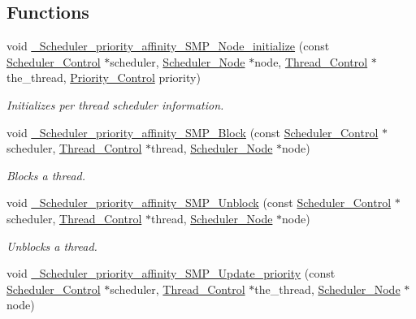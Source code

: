 \subsection*{Functions}
\begin{DoxyCompactItemize}
\item 
void \mbox{\hyperlink{group__RTEMSScoreSchedulerPriorityAffinitySMP_ga725bf680167bbb6b5cb1ed149ee5c263}{\+\_\+\+Scheduler\+\_\+priority\+\_\+affinity\+\_\+\+S\+M\+P\+\_\+\+Node\+\_\+initialize}} (const \mbox{\hyperlink{struct__Scheduler__Control}{Scheduler\+\_\+\+Control}} $\ast$scheduler, \mbox{\hyperlink{structScheduler__Node}{Scheduler\+\_\+\+Node}} $\ast$node, \mbox{\hyperlink{struct__Thread__Control}{Thread\+\_\+\+Control}} $\ast$the\+\_\+thread, \mbox{\hyperlink{group__RTEMSScorePriority_ga59d02b58072d31a9a1cfe644557aefe2}{Priority\+\_\+\+Control}} priority)
\begin{DoxyCompactList}\small\item\em Initializes per thread scheduler information. \end{DoxyCompactList}\item 
void \mbox{\hyperlink{group__RTEMSScoreSchedulerPriorityAffinitySMP_ga98f79ed789d7aebe859512080fb8523b}{\+\_\+\+Scheduler\+\_\+priority\+\_\+affinity\+\_\+\+S\+M\+P\+\_\+\+Block}} (const \mbox{\hyperlink{struct__Scheduler__Control}{Scheduler\+\_\+\+Control}} $\ast$scheduler, \mbox{\hyperlink{struct__Thread__Control}{Thread\+\_\+\+Control}} $\ast$thread, \mbox{\hyperlink{structScheduler__Node}{Scheduler\+\_\+\+Node}} $\ast$node)
\begin{DoxyCompactList}\small\item\em Blocks a thread. \end{DoxyCompactList}\item 
void \mbox{\hyperlink{group__RTEMSScoreSchedulerPriorityAffinitySMP_gaf91960e285674e3280c62820c47e163e}{\+\_\+\+Scheduler\+\_\+priority\+\_\+affinity\+\_\+\+S\+M\+P\+\_\+\+Unblock}} (const \mbox{\hyperlink{struct__Scheduler__Control}{Scheduler\+\_\+\+Control}} $\ast$scheduler, \mbox{\hyperlink{struct__Thread__Control}{Thread\+\_\+\+Control}} $\ast$thread, \mbox{\hyperlink{structScheduler__Node}{Scheduler\+\_\+\+Node}} $\ast$node)
\begin{DoxyCompactList}\small\item\em Unblocks a thread. \end{DoxyCompactList}\item 
void \mbox{\hyperlink{group__RTEMSScoreSchedulerPriorityAffinitySMP_gac4acb6359695ecfb294a5c3e9d67a726}{\+\_\+\+Scheduler\+\_\+priority\+\_\+affinity\+\_\+\+S\+M\+P\+\_\+\+Update\+\_\+priority}} (const \mbox{\hyperlink{struct__Scheduler__Control}{Scheduler\+\_\+\+Control}} $\ast$scheduler, \mbox{\hyperlink{struct__Thread__Control}{Thread\+\_\+\+Control}} $\ast$the\+\_\+thread, \mbox{\hyperlink{structScheduler__Node}{Scheduler\+\_\+\+Node}} $\ast$node)

\end{DoxyCompactItemize}
